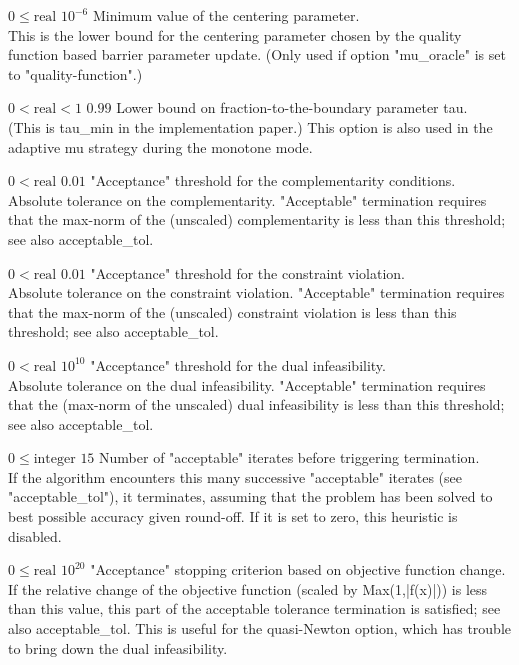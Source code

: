 %
{$0\leq\textrm{real}$}%
{$10^{- 6}$}%
{Minimum value of the centering parameter.\\
This is the lower bound for the centering parameter chosen by the quality function based barrier parameter update. (Only used if option "mu\_oracle" is set to "quality-function".)}%
{}

%
{$0<\textrm{real}<1$}%
{$0.99$}%
{Lower bound on fraction-to-the-boundary parameter tau.\\
(This is tau\_min in the implementation paper.)  This option is also used in the adaptive mu strategy during the monotone mode.}%
{}

%
{$0<\textrm{real}$}%
{$0.01$}%
{"Acceptance" threshold for the complementarity conditions.\\
Absolute tolerance on the complementarity. "Acceptable" termination requires that the max-norm of the (unscaled) complementarity is less than this threshold; see also acceptable\_tol.}%
{}

%
{$0<\textrm{real}$}%
{$0.01$}%
{"Acceptance" threshold for the constraint violation.\\
Absolute tolerance on the constraint violation. "Acceptable" termination requires that the max-norm of the (unscaled) constraint violation is less than this threshold; see also acceptable\_tol.}%
{}

%
{$0<\textrm{real}$}%
{$10^{ 10}$}%
{"Acceptance" threshold for the dual infeasibility.\\
Absolute tolerance on the dual infeasibility. "Acceptable" termination requires that the (max-norm of the unscaled) dual infeasibility is less than this threshold; see also acceptable\_tol.}%
{}

%
{$0\leq\textrm{integer}$}%
{$15$}%
{Number of "acceptable" iterates before triggering termination.\\
If the algorithm encounters this many successive "acceptable" iterates (see "acceptable\_tol"), it terminates, assuming that the problem has been solved to best possible accuracy given round-off.  If it is set to zero, this heuristic is disabled.}%
{}

%
{$0\leq\textrm{real}$}%
{$10^{ 20}$}%
{"Acceptance" stopping criterion based on objective function change.\\
If the relative change of the objective function (scaled by Max(1,|f(x)|)) is less than this value, this part of the acceptable tolerance termination is satisfied; see also acceptable\_tol.  This is useful for the quasi-Newton option, which has trouble to bring down the dual infeasibility.}%
{}

